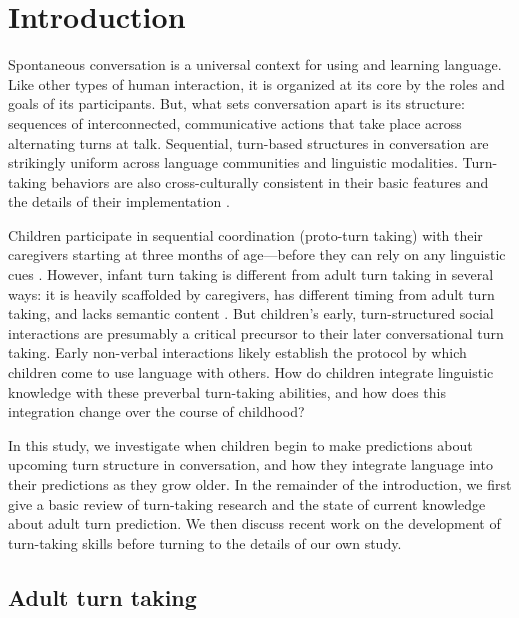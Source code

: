 \documentclass[authoryear, 12pt]{elsarticle}
\begin{document}
\linenumbers

\section{Introduction}
\label{sec:intro}

Spontaneous conversation is a universal context for using and learning language. Like other types of human interaction, it is organized at its core by the roles and goals of its participants. But, what sets conversation apart is its structure: sequences of interconnected, communicative actions that take place across alternating turns at talk. Sequential, turn-based structures in conversation are strikingly uniform across language communities and linguistic modalities. Turn-taking behaviors are also cross-culturally consistent in their basic features and the details of their implementation \citep{de-vos2015, dingemanse2013, stivers2009}. 

Children participate in sequential coordination (proto-turn taking) with their caregivers starting at three months of age---before they can rely on any linguistic cues \citep[see, among others, ][]{bateson1975, hilbrink2015, jaffe2001, snow1977}. However, infant turn taking is different from adult turn taking in several ways: it is heavily scaffolded by caregivers, has different timing from adult turn taking, and lacks semantic content \citep{hilbrink2015, jaffe2001}. But children's early, turn-structured social interactions are presumably a critical precursor to their later conversational turn taking. Early non-verbal interactions likely establish the protocol by which children come to use language with others. How do children integrate linguistic knowledge with these preverbal turn-taking abilities, and how does this integration change over the course of childhood? 

In this study, we investigate when children begin to make predictions about upcoming turn structure in conversation, and how they integrate language into their predictions as they grow older. In the remainder of the introduction, we first give a basic review of turn-taking research and the state of current knowledge about adult turn prediction. We then discuss recent work on the development of turn-taking skills before turning to the details of our own study.

\subsection{Adult turn taking}
\end{document}
